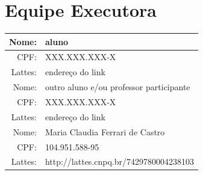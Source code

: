 \documentclass[rascunho,xindy]{Classe-Latex-FEI/fei}
\begin{document}
\chapter{Equipe Executora}

\begin{tabular}{| r || l |}
    \hline
        Nome:   & aluno \\ \hline
        CPF:    & XXX.XXX.XXX-X \\ \hline
        Lattes: & endereço do link \\ \hline
    \hline
        Nome:   & outro aluno e/ou professor participante \\ \hline
        CPF:    & XXX.XXX.XXX-X \\ \hline
        Lattes: & endereço do link \\ \hline
    \hline
        Nome:   & Maria Claudia Ferrari de Castro \\ \hline
        CPF:    & 104.951.588-95 \\ \hline
        Lattes: & http://lattes.cnpq.br/7429780004238103 \\
    \hline
\end{tabular}


\end{document}
